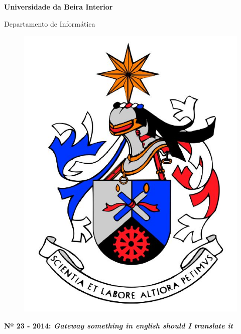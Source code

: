 
\thispagestyle{empty}
\setcounter{page}{-1}

\begin{center}
\begin{Huge}
\textbf{Universidade da Beira Interior}
\end{Huge}
\end{center}

\begin{center}
\begin{Huge}
Departamento de Informática
\end{Huge}
\end{center}

\vspace{0,07cm}
\begin{figure}[!htb]
\centering
\includegraphics[scale=0.3]{brasaoubi.JPG}
\end{figure}

\vspace{0.5cm}
\begin{center}
\begin{Large}
\textbf{Nº 23 - 2014: \emph{Gateway something in english should I translate it}}
\end{Large}
\end{center}


